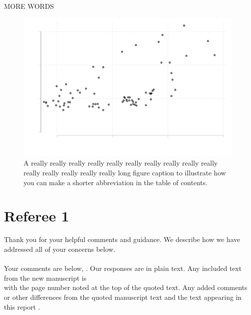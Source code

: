 \documentclass[11pt,leqno]{article}
\begin{document}
    \newpage
    \begin{tcolorbox}[left = 1em, top = 1ex, bottom = 1ex, colupper=black, colback=white, adjusted title = From page \hl{XX} (continued)]
        {\color{red} {}}\\
        
        MORE WORDS
        
     
    \end{tcolorbox}
\FloatBarrier
\begin{figure}[h]
    \caption[Abbreviated Caption]{A really really really really really really really really really really really really really really really long figure caption to illustrate how you can make a shorter abbreviation in the table of contents.}
      \centering
      \includegraphics[width=\linewidth]{output/simple_scatter.pdf}

    \label{fig:simple_scatter}
\end{figure}
\FloatBarrier

 \newpage
\section*{Referee 1}
Thank you for your helpful comments and guidance. We describe how we have addressed all of your concerns below. \\
\\
Your comments are below,  . Our responses are in plain text. Any included text from the new manuscript is  \\
 with the page number noted at the top of the quoted text. 
Any added comments or other differences from the quoted manuscript text and the text appearing in this report {\color{red} {}}. \\
\\
\end{document}
